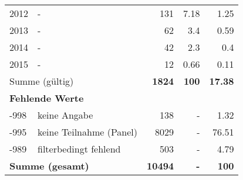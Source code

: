 \begin{longtable}{lXrrr}
     2012 &
     \multicolumn{1}{X}{ -  } &


       \num{131} &
       \num[round-mode=places,round-precision=2]{7,18} &
         \num[round-mode=places,round-precision=2]{1,25} \\

     2013 &
     \multicolumn{1}{X}{ -  } &


       \num{62} &
       \num[round-mode=places,round-precision=2]{3,4} &
         \num[round-mode=places,round-precision=2]{0,59} \\

     2014 &
     \multicolumn{1}{X}{ -  } &


       \num{42} &
       \num[round-mode=places,round-precision=2]{2,3} &
         \num[round-mode=places,round-precision=2]{0,4} \\

     2015 &
     \multicolumn{1}{X}{ -  } &


       \num{12} &
       \num[round-mode=places,round-precision=2]{0,66} &
         \num[round-mode=places,round-precision=2]{0,11} \\
     \midrule
     \multicolumn{2}{l}{Summe (gültig)} &
       \textbf{\num{1824}} &
     \textbf{100} &
       \textbf{\num[round-mode=places,round-precision=2]{17,38}} \\
     \multicolumn{5}{l}{\textbf{Fehlende Werte}}\\
       -998 &
       keine Angabe &
         \num{138} &
        - &
         \num[round-mode=places,round-precision=2]{1,32} \\
       -995 &
       keine Teilnahme (Panel) &
         \num{8029} &
        - &
         \num[round-mode=places,round-precision=2]{76,51} \\
       -989 &
       filterbedingt fehlend &
         \num{503} &
        - &
         \num[round-mode=places,round-precision=2]{4,79} \\
     \midrule
     \multicolumn{2}{l}{\textbf{Summe (gesamt)}} &
          \textbf{\num{10494}} &
        \textbf{-} &
        \textbf{100} \\
     \bottomrule
     \end{longtable}
     
